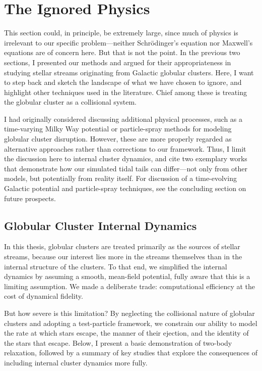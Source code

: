 \section{The Ignored Physics} \label{sec:ignoredphysics}
    This section could, in principle, be extremely large, since much of physics is irrelevant to our specific problem—neither Schrödinger's equation nor Maxwell's equations are of concern here. But that is not the point. In the previous two sections, I presented our methods and argued for their appropriateness in studying stellar streams originating from Galactic globular clusters. Here, I want to step back and sketch the landscape of what we have chosen to ignore, and highlight other techniques used in the literature. Chief among these is treating the globular cluster as a collisional system.

    I had originally considered discussing additional physical processes, such as a time-varying Milky Way potential or particle-spray methods for modeling globular cluster disruption. However, these are more properly regarded as alternative approaches rather than corrections to our framework. Thus, I limit the discussion here to internal cluster dynamics, and cite two exemplary works that demonstrate how our simulated tidal tails can differ—not only from other models, but potentially from reality itself. For discussion of a time-evolving Galactic potential and particle-spray techniques, see the concluding section on future prospects.

    \subsection{Globular Cluster Internal Dynamics} \label{sec:collisionalDynamics}
        In this thesis, globular clusters are treated primarily as the sources of stellar streams, because our interest lies more in the streams themselves than in the internal structure of the clusters. To that end, we simplified the internal dynamics by assuming a smooth, mean-field potential, fully aware that this is a limiting assumption. We made a deliberate trade: computational efficiency at the cost of dynamical fidelity.

        But how severe is this limitation? By neglecting the collisional nature of globular clusters and adopting a test-particle framework, we constrain our ability to model the rate at which stars escape, the manner of their ejection, and the identity of the stars that escape. Below, I present a basic demonstration of two-body relaxation, followed by a summary of key studies that explore the consequences of including internal cluster dynamics more fully.


